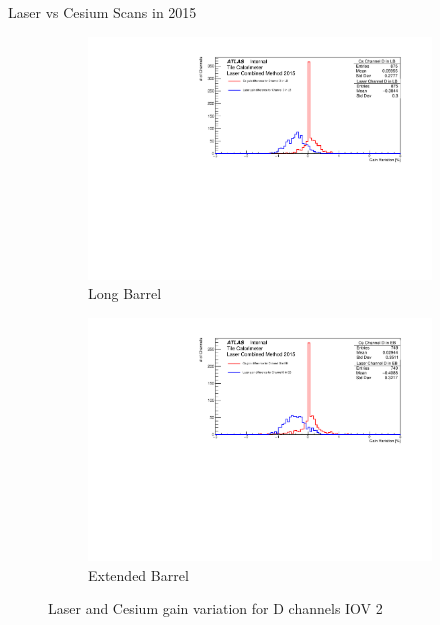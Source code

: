 \documentclass{beamer}
\begin{document}
\begin{frame}{Laser vs Cesium Scans in 2015}
\begin{figure}[H]
\centering
\begin{subfigure} [t] {0.49\textwidth}
\includegraphics[width=\textwidth]{cs1d_d_lb_iov2.pdf}
\caption{Long Barrel}
\end{subfigure}
\begin{subfigure} [t] {0.49\textwidth}
\includegraphics[width=\textwidth]{cs1d_d_eb_iov2.pdf}
\caption{Extended Barrel}
\end{subfigure}
\caption{Laser and Cesium gain variation for D channels IOV 2}
\end{figure}
\end{frame}
\end{document}
